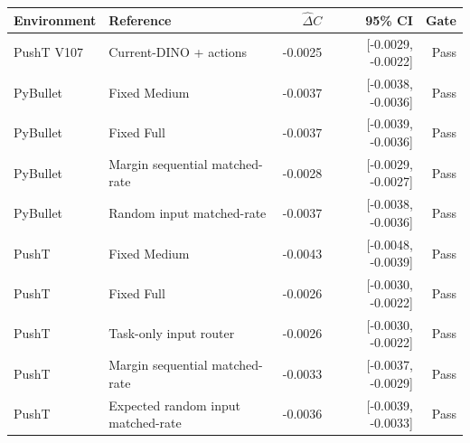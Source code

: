 \begin{tabular}{llrrr}
\toprule
Environment & Reference & $\widehat\Delta C$ & 95\% CI & Gate \\
\midrule
PushT V107 & Current-DINO + actions & -0.0025 & [-0.0029, -0.0022] & Pass \\
PyBullet & Fixed Medium & -0.0037 & [-0.0038, -0.0036] & Pass \\
PyBullet & Fixed Full & -0.0037 & [-0.0039, -0.0036] & Pass \\
PyBullet & Margin sequential matched-rate & -0.0028 & [-0.0029, -0.0027] & Pass \\
PyBullet & Random input matched-rate & -0.0037 & [-0.0038, -0.0036] & Pass \\
PushT & Fixed Medium & -0.0043 & [-0.0048, -0.0039] & Pass \\
PushT & Fixed Full & -0.0026 & [-0.0030, -0.0022] & Pass \\
PushT & Task-only input router & -0.0026 & [-0.0030, -0.0022] & Pass \\
PushT & Margin sequential matched-rate & -0.0033 & [-0.0037, -0.0029] & Pass \\
PushT & Expected random input matched-rate & -0.0036 & [-0.0039, -0.0033] & Pass \\
\bottomrule
\end{tabular}
